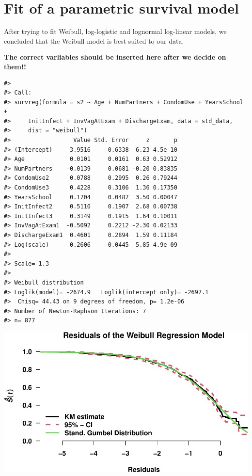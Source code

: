 \documentclass[
]{article}
\begin{document}
\hypertarget{fit-of-a-parametric-survival-model}{%
\section{Fit of a parametric survival model}\label{fit-of-a-parametric-survival-model}}

After trying to fit Weibull, log-logistic and lognormal log-linear models, we concluded that the Weibull model is best suited to our data.

\textbf{The correct varliables should be inserted here after we decide on them!!}

\begin{verbatim}
#> 
#> Call:
#> survreg(formula = s2 ~ Age + NumPartners + CondomUse + YearsSchool + 
#>     InitInfect + InvVagAtExam + DischargeExam, data = std_data, 
#>     dist = "weibull")
#>                  Value Std. Error     z       p
#> (Intercept)     3.9516     0.6338  6.23 4.5e-10
#> Age             0.0101     0.0161  0.63 0.52912
#> NumPartners    -0.0139     0.0681 -0.20 0.83835
#> CondomUse2      0.0788     0.2995  0.26 0.79244
#> CondomUse3      0.4228     0.3106  1.36 0.17350
#> YearsSchool     0.1704     0.0487  3.50 0.00047
#> InitInfect2     0.5110     0.1907  2.68 0.00738
#> InitInfect3     0.3149     0.1915  1.64 0.10011
#> InvVagAtExam1  -0.5092     0.2212 -2.30 0.02133
#> DischargeExam1  0.4601     0.2894  1.59 0.11184
#> Log(scale)      0.2606     0.0445  5.85 4.9e-09
#> 
#> Scale= 1.3 
#> 
#> Weibull distribution
#> Loglik(model)= -2674.9   Loglik(intercept only)= -2697.1
#>  Chisq= 44.43 on 9 degrees of freedom, p= 1.2e-06 
#> Number of Newton-Raphson Iterations: 7 
#> n= 877
\end{verbatim}

\includegraphics{practical_files/figure-latex/unnamed-chunk-5-1.pdf}
\end{document}
